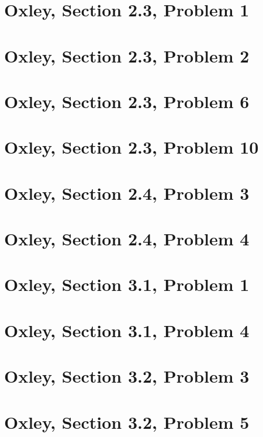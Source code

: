     \section{Oxley, Section 2.3, Problem 1}
        
        \clearpage

    \section{Oxley, Section 2.3, Problem 2}
        
        \clearpage

    \section{Oxley, Section 2.3, Problem 6}
        
        \clearpage

    \section{Oxley, Section 2.3, Problem 10}
        
        \clearpage

    \section{Oxley, Section 2.4, Problem 3}
        
        \clearpage

    \section{Oxley, Section 2.4, Problem 4}
        
        \clearpage

    \section{Oxley, Section 3.1, Problem 1}
        
        \clearpage

    \section{Oxley, Section 3.1, Problem 4}
        
        \clearpage

    \section{Oxley, Section 3.2, Problem 3}
        
        \clearpage

    \section{Oxley, Section 3.2, Problem 5}
        
        \clearpage
